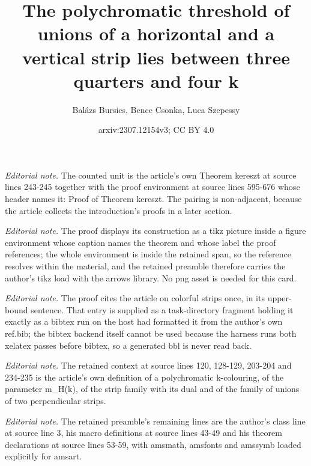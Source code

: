 \documentclass[11pt,oneside]{amsart}
\title{The polychromatic threshold of unions of a horizontal and a vertical strip lies between three quarters and four k}
\author{Balázs Bursics, Bence Csonka, Luca Szepessy}
\date{arxiv:2307.12154v3; CC BY 4.0}
\begin{document}
\maketitle
\noindent\textit{Editorial note.} The counted unit is the article's own Theorem kereszt at source lines 243-245 together with the proof environment at source lines 595-676 whose header names it: Proof of Theorem kereszt. The pairing is non-adjacent, because the article collects the introduction's proofs in a later section.\par\medskip
\noindent\textit{Editorial note.} The proof displays its construction as a tikz picture inside a figure environment whose caption names the theorem and whose label the proof references; the whole environment is inside the retained span, so the reference resolves within the material, and the retained preamble therefore carries the author's tikz load with the arrows library. No png asset is needed for this card.\par\medskip
\noindent\textit{Editorial note.} The proof cites the article on colorful strips once, in its upper-bound sentence. That entry is supplied as a task-directory fragment holding it exactly as a bibtex run on the host had formatted it from the author's own ref.bib; the bibtex backend itself cannot be used because the harness runs both xelatex passes before bibtex, so a generated bbl is never read back.\par\medskip
\noindent\textit{Editorial note.} The retained context at source lines 120, 128-129, 203-204 and 234-235 is the article's own definition of a polychromatic k-colouring, of the parameter m\_H(k), of the strip family with its dual and of the family of unions of two perpendicular strips.\par\medskip
\noindent\textit{Editorial note.} The retained preamble's remaining lines are the author's class line at source line 3, his macro definitions at source lines 43-49 and his theorem declarations at source lines 53-59, with amsmath, amsfonts and amssymb loaded explicitly for amsart.\par\medskip
\end{document}
